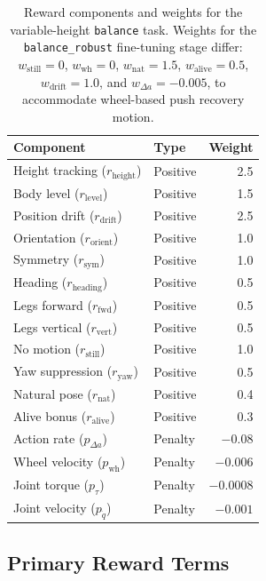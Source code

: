 \documentclass[conference]{IEEEtran}
\begin{document}
\begin{table}[t]
\centering
\caption{Reward components and weights for the variable-height
\texttt{balance} task.
Weights for the \texttt{balance\_robust} fine-tuning stage differ:
$w_{\mathrm{still}}=0$, $w_{\mathrm{wh}}=0$,
$w_{\mathrm{nat}}=1.5$, $w_{\mathrm{alive}}=0.5$,
$w_{\mathrm{drift}}=1.0$, and $w_{\Delta a}=-0.005$,
to accommodate wheel-based push recovery motion.}
\label{tab:reward_weights}
\begin{tabular}{l l r}
\toprule
Component & Type & Weight \\
\midrule
Height tracking ($r_{\mathrm{height}}$)    & Positive & 2.5    \\
Body level ($r_{\mathrm{level}}$)          & Positive & 1.5    \\
Position drift ($r_{\mathrm{drift}}$)      & Positive & 2.5    \\
Orientation ($r_{\mathrm{orient}}$)        & Positive & 1.0    \\
Symmetry ($r_{\mathrm{sym}}$)              & Positive & 1.0    \\
Heading ($r_{\mathrm{heading}}$)           & Positive & 0.5    \\
Legs forward ($r_{\mathrm{fwd}}$)          & Positive & 0.5    \\
Legs vertical ($r_{\mathrm{vert}}$)        & Positive & 0.5    \\
No motion ($r_{\mathrm{still}}$)           & Positive & 1.0    \\
Yaw suppression ($r_{\mathrm{yaw}}$)       & Positive & 0.5    \\
Natural pose ($r_{\mathrm{nat}}$)          & Positive & 0.4    \\
Alive bonus ($r_{\mathrm{alive}}$)         & Positive & 0.3    \\
Action rate ($p_{\Delta a}$)               & Penalty  & $-0.08$    \\
Wheel velocity ($p_{\mathrm{wh}}$)         & Penalty  & $-0.006$   \\
Joint torque ($p_\tau$)                    & Penalty  & $-0.0008$  \\
Joint velocity ($p_{\dot{q}}$)             & Penalty  & $-0.001$ \\
\bottomrule
\end{tabular}
\end{table}

\subsection{Primary Reward Terms}
\end{document}
